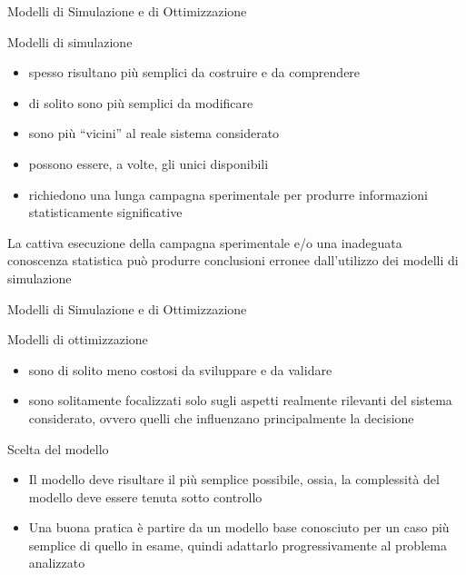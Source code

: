 \documentclass{beamer}
\begin{document}
\begin{frame}{Modelli di Simulazione e di Ottimizzazione}
  \begin{block}{Modelli di simulazione}
   \begin{itemize}
    \item spesso risultano pi\`u semplici da costruire e da comprendere
    \item di solito sono pi\`u semplici da modificare
    \item sono pi\`u ``vicini'' al reale sistema considerato
    \item possono essere, a volte, gli unici disponibili
    \item richiedono una lunga campagna sperimentale per produrre informazioni statisticamente significative
   \end{itemize}
  \end{block}

 La cattiva esecuzione della campagna sperimentale e/o una inadeguata conoscenza statistica pu\`o produrre conclusioni erronee dall’utilizzo dei modelli di simulazione
\end{frame}

\begin{frame}{Modelli di Simulazione e di Ottimizzazione}
  \begin{block}{Modelli di ottimizzazione}
   \begin{itemize}
    \item sono di solito meno costosi da sviluppare e da validare
    \item sono solitamente focalizzati solo sugli aspetti realmente rilevanti del sistema considerato, ovvero quelli che influenzano principalmente la decisione
   \end{itemize}
  \end{block}
\end{frame}

\begin{frame}{Scelta del modello}
  \begin{itemize}
   \item Il modello deve risultare il pi\`u semplice possibile, ossia, la complessit\`a del modello deve essere tenuta sotto controllo
   \item Una buona pratica \`e partire da un modello base conosciuto per un caso pi\`u semplice di quello in esame, quindi adattarlo progressivamente al problema analizzato
  \end{itemize}
\end{frame}
\end{document}
